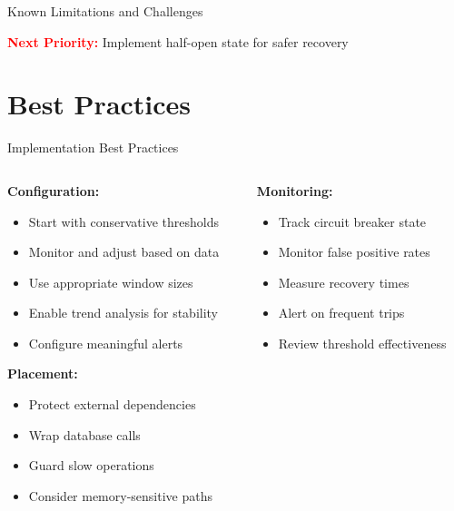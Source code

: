 \documentclass[aspectratio=169]{beamer}
\begin{document}
\begin{frame}{Known Limitations and Challenges}
    \vspace{0.5cm}
    \begin{center}
        \textcolor{red}{\textbf{Next Priority:}} Implement half-open state for safer recovery
    \end{center}
\end{frame}

\section{Best Practices}

\begin{frame}{Implementation Best Practices}
    \begin{columns}
        \begin{column}{0.5\textwidth}
            \textbf{Configuration:}
            \begin{itemize}
                \item Start with conservative thresholds
                \item Monitor and adjust based on data
                \item Use appropriate window sizes
                \item Enable trend analysis for stability
                \item Configure meaningful alerts
            \end{itemize}
            
            \vspace{0.3cm}
            \textbf{Placement:}
            \begin{itemize}
                \item Protect external dependencies
                \item Wrap database calls
                \item Guard slow operations
                \item Consider memory-sensitive paths
            \end{itemize}
        \end{column}
        \begin{column}{0.5\textwidth}
            \textbf{Monitoring:}
            \begin{itemize}
                \item Track circuit breaker state
                \item Monitor false positive rates
                \item Measure recovery times
                \item Alert on frequent trips
                \item Review threshold effectiveness
            \end{itemize}
            

\end{column}
\end{columns}
\end{frame}
\end{document}
